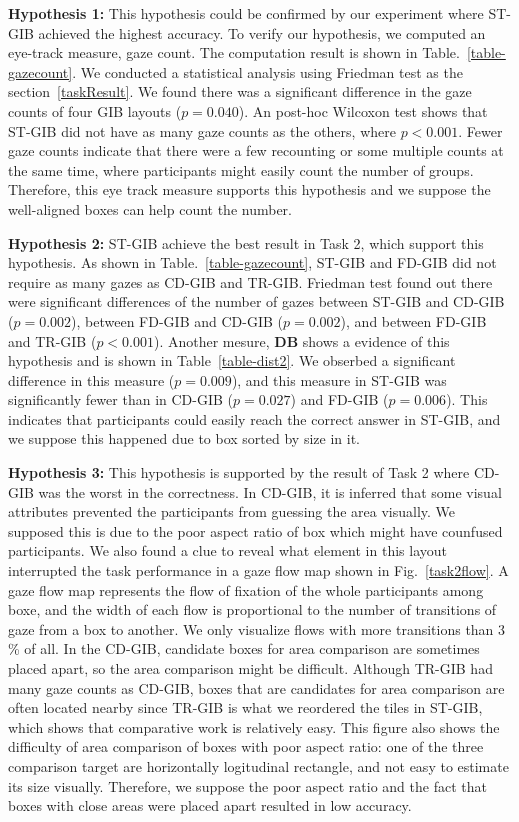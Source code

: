 \documentclass{vgtc}                          %
\begin{document}
{\bf Hypothesis 1:} This hypothesis could be confirmed by our experiment where ST-GIB achieved the highest accuracy. To verify our hypothesis, we computed an eye-track measure, gaze count. The computation result is shown in Table.~\ref{table-gazecount}. We conducted a statistical analysis using Friedman test as the section~\ref{taskResult}. We found there was a significant difference in the gaze counts of four GIB layouts ($p=0.040$). An post-hoc Wilcoxon test shows that ST-GIB did not have as many gaze counts as the others, where $p<0.001$. Fewer gaze counts indicate that there were a few recounting or some multiple counts at the same time, where participants might easily count the number of groups. Therefore, this eye track measure supports this hypothesis and we suppose the well-aligned boxes can help count the number.

{\bf Hypothesis 2:} ST-GIB achieve the best result in Task 2, which support this hypothesis. As shown in Table.~\ref{table-gazecount}, ST-GIB and FD-GIB did not require as many gazes as CD-GIB and TR-GIB. Friedman test found out there were significant differences of the number of gazes between ST-GIB and CD-GIB ($p=0.002$), between FD-GIB and CD-GIB ($p=0.002$), and between FD-GIB and TR-GIB ($p<0.001$). Another mesure, {\bf DB} shows a evidence of this hypothesis and is shown in Table~\ref{table-dist2}. We obserbed a significant difference in this measure ($p=0.009$), and this measure in ST-GIB was significantly fewer than in CD-GIB ($p=0.027$) and FD-GIB ($p=0.006$). This indicates that participants could easily reach the correct answer in ST-GIB, and we suppose this happened due to box sorted by size in it.

{\bf Hypothesis 3:} This hypothesis is supported by the result of Task 2 where CD-GIB was the worst in the correctness. In CD-GIB, it is inferred that some visual attributes prevented the participants from guessing the area visually.
We supposed this is due to the poor aspect ratio of box which might have counfused participants. We also found a clue to reveal what element in this layout interrupted the task performance in a gaze flow map shown in Fig.~\ref{task2flow}.
A gaze flow map represents the flow of fixation of the whole participants among boxe, and the width of each flow is proportional to the number of transitions of gaze from a box to another. We only visualize flows with more transitions than 3 \% of all. In the CD-GIB, candidate boxes for area comparison are sometimes placed apart, so the area comparison might be difficult.
Although TR-GIB had many gaze counts as CD-GIB, boxes that are candidates for area comparison are often located nearby since TR-GIB is what we reordered the tiles in ST-GIB, which shows that comparative work is relatively easy.
This figure also shows the difficulty of area comparison of boxes with poor aspect ratio: one of the three comparison target are horizontally logitudinal rectangle, and not easy to estimate its size visually. Therefore, we suppose the poor aspect ratio and the fact that boxes with close areas were placed apart resulted in low accuracy.
\end{document}
